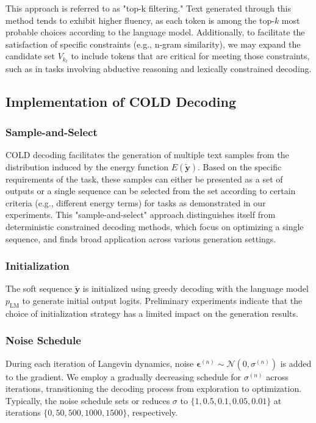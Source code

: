 \documentclass{article}
\begin{document}
This approach is referred to as "top-k filtering." Text generated through this method tends to exhibit higher fluency, as each token is among the top-\(k\) most probable choices according to the language model. Additionally, to facilitate the satisfaction of specific constraints (e.g., n-gram similarity), we may expand the candidate set \(V_{k_t}\) to include tokens that are critical for meeting those constraints, such as in tasks involving abductive reasoning and lexically constrained decoding.

\subsection{Implementation of COLD Decoding}

\subsubsection*{Sample-and-Select}
COLD decoding facilitates the generation of multiple text samples from the distribution induced by the energy function \(E(\mathbf{\tilde{y}})\). Based on the specific requirements of the task, these samples can either be presented as a set of outputs or a single sequence can be selected from the set according to certain criteria (e.g., different energy terms) for tasks as demonstrated in our experiments. This "sample-and-select" approach distinguishes itself from deterministic constrained decoding methods, which focus on optimizing a single sequence, and finds broad application across various generation settings.

\subsubsection*{Initialization}
The soft sequence \(\mathbf{\tilde{y}}\) is initialized using greedy decoding with the language model \(p_{\text{LM}}\) to generate initial output logits. Preliminary experiments indicate that the choice of initialization strategy has a limited impact on the generation results.

\subsubsection*{Noise Schedule}
During each iteration of Langevin dynamics, noise \(\boldsymbol{\epsilon}^{(n)} \sim \mathcal{N}(0, \sigma^{(n)})\) is added to the gradient. We employ a gradually decreasing schedule for \(\sigma^{(n)}\) across iterations, transitioning the decoding process from exploration to optimization. Typically, the noise schedule sets or reduces \(\sigma\) to \(\{1, 0.5, 0.1, 0.05, 0.01\}\) at iterations \(\{0, 50, 500, 1000, 1500\}\), respectively.
\end{document}
